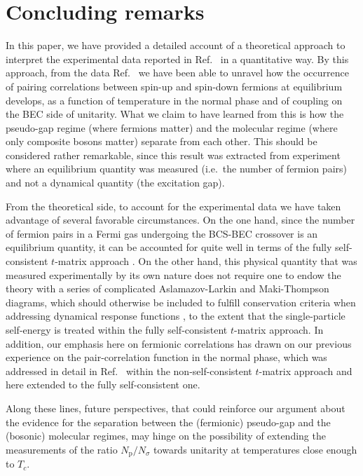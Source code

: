 \documentclass[pra,twocolumn,aps,amssymb,showpacs,superscriptaddress]{revtex4-1}
\begin{document}
\section{Concluding remarks}
\label{sec:conclusions}

In this paper, we have provided a detailed account of a theoretical approach to interpret the experimental data reported in Ref.~\cite{Ulm-Cam-2019} in a quantitative way.
By this approach, from the data Ref.~\cite{Ulm-Cam-2019} we have been able to unravel how the occurrence of pairing correlations between spin-up and spin-down fermions at equilibrium develops, as a function of temperature in the normal phase and of coupling on the BEC side of unitarity.
What we claim to have learned from this is how the pseudo-gap regime (where fermions matter) and the molecular regime (where only composite bosons matter) separate from each other. This should be considered rather remarkable, since this result was extracted from experiment \cite{Ulm-Cam-2019} where an equilibrium quantity was measured (i.e.~the number of fermion pairs) and not a dynamical quantity (the excitation gap).
 
From the theoretical side, to account for the experimental data we have taken advantage of several favorable circumstances.
On the one hand, since the number of fermion pairs in a Fermi gas undergoing the BCS-BEC crossover is an equilibrium quantity, it can be accounted for quite well in terms of the fully self-consistent $t$-matrix approach \cite{PPS-2019}.
On the other hand, this physical quantity that was measured experimentally by its own nature does not require one to endow the theory with a series of complicated Aslamazov-Larkin and Maki-Thompson diagrams, 
which should otherwise be included to fulfill conservation criteria when addressing dynamical response functions \cite{Baym-1962}, to the extent that the single-particle self-energy is treated within the fully self-consistent $t$-matrix approach.
In addition, our emphasis here on fermionic correlations has drawn on our previous experience on the pair-correlation function in the normal phase, which was addressed in detail in Ref.~\cite{Palestini-2014}
within the non-self-consistent $t$-matrix approach and here extended to the fully self-consistent one.

Along these lines, future perspectives, that could reinforce our argument about the evidence for the separation between the (fermionic) pseudo-gap and the (bosonic) molecular regimes, may hinge on the possibility of extending the measurements of the ratio $N_{\mathrm{p}}/N_{\sigma}$ towards unitarity at temperatures close enough to $T_{c}$.
\end{document}
